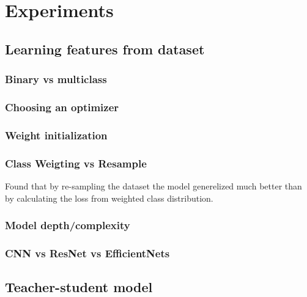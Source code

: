 \documentclass[thesis.tex]{subfiles}
\begin{document}
\chapter{Experiments} \label{chap:experiments}


\section{Learning features from dataset}


\subsection{Binary vs multiclass}


\subsection{Choosing an optimizer}


\subsection{Weight initialization}


\subsection{Class Weigting vs Resample}
Found that by re-sampling the dataset the model generelized much better than by calculating the loss from weighted class distribution.


\subsection{Model depth/complexity}


\subsection{CNN vs ResNet vs EfficientNets}



\section{Teacher-student model}
\end{document}
